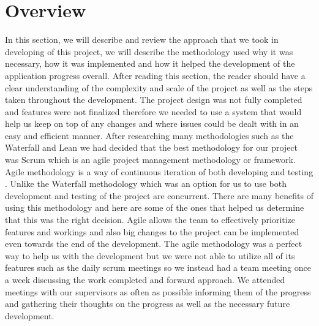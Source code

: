 \section{Overview}
In this section, we will describe and review the approach that we took in developing of
this project, we will describe the methodology used why it was necessary, how it was
implemented and how it helped the development of the application progress overall.
After reading this section, the reader should have a clear understanding of the complexity
and scale of the project as well as the steps taken throughout the development. The project
design was not fully completed and features were not finalized therefore we needed to use
a system that would help us keep on top of any changes and where issues could be dealt
with in an easy and efficient manner.
After researching many methodologies such as the Waterfall and Lean we had decided that the best methodology for our project was Scrum which is an agile project
management methodology or framework. Agile methodology is a way of continuous iteration of both developing and testing \cite{agile}. Unlike the Waterfall methodology which was an
option for us to use both development and testing of the project are concurrent. There
are many benefits of using this methodology and here are some of the ones that helped us determine that this was the right decision.
Agile allows the team to effectively prioritize features and workings and also big changes to
the project can be implemented even towards the end of the development. The agile methodology was a perfect way to help us with the development but we were not able to utilize all of its features such as the daily scrum meetings so we instead had a team meeting once a week discussing the work completed and forward approach. We attended meetings with our supervisors as often as possible informing them of the progress
and gathering their thoughts on the progress as well as the necessary future development.

